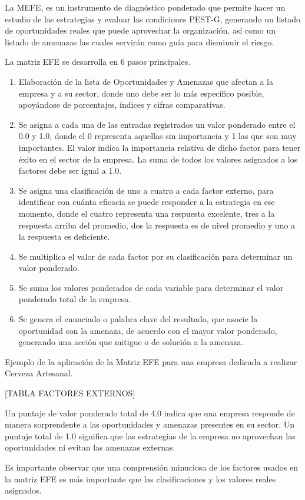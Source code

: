 La MEFE, es un instrumento de diagnóstico ponderado que permite hacer un estudio de las estrategias y evaluar las condiciones PEST-G, generando un listado de oportunidades reales que puede aprovechar la organización, así como un listado de amenazas las cuales servirán como guía para disminuir el riesgo.

La matriz EFE se desarrolla en 6 pasos principales.
\begin{enumerate}
	\item Elaboración de la lista de Oportunidades y Amenazas que afectan a la empresa y a su sector, donde uno debe ser lo más específico posible, apoyándose de porcentajes, índices y cifras comparativas.
	\item Se asigna a cada una de las entradas registrados un valor ponderado entre el 0.0 y 1.0, donde el 0 representa aquellas sin importancia y 1 las que son muy importantes. El valor indica la importancia relativa de dicho factor para tener éxito en el sector de la empresa. La suma de todos los valores asignados a los factores debe ser igual a 1.0.
	\item Se asigna una clasificación de uno a cuatro a cada factor externo, para identificar con cuánta eficacia se puede responder a la estrategia en ese momento, donde el cuatro representa una respuesta excelente, tres a la respuesta arriba del promedio, dos la respuesta es de nivel promedio y uno a la respuesta es deficiente.
	\item Se multiplica el valor de cada factor por su clasificación para determinar un valor ponderado.
	\item Se suma los valores ponderados de cada variable para determinar el valor ponderado total de la empresa.
	\item Se genera el enunciado o palabra clave del resultado, que asocie la oportunidad con la amenaza, de acuerdo con el mayor valor ponderado, generando una acción que mitigue o de solución a la amenaza.
\end{enumerate}

Ejemplo de la aplicación de la Matriz EFE para una empresa dedicada a realizar Cerveza Artesanal.

\begin{center}
[TABLA FACTORES EXTERNOS]
\end{center}

Un puntaje de valor ponderado total de 4.0 indica que una empresa responde de manera sorprendente a las oportunidades y amenazas presentes en su sector. Un puntaje total de 1.0 significa que las estrategias de la empresa no aprovechan las oportunidades ni evitan las amenazas externas.

Es importante observar que una comprensión minuciosa de los factores usados en la matriz EFE es más importante que las clasificaciones y los valores reales asignados.